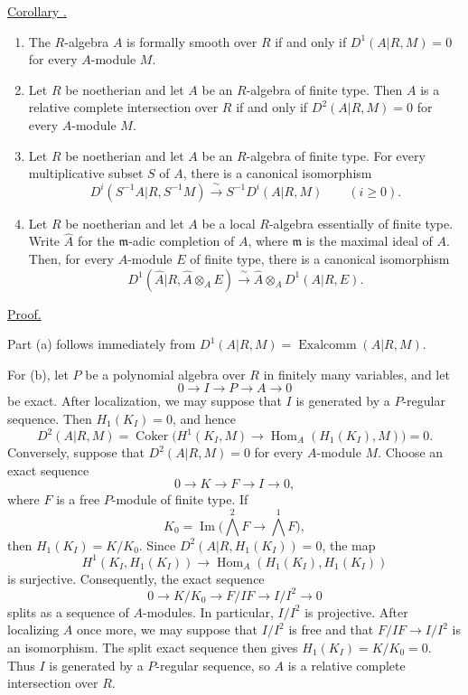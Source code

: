 
\underline{Corollary .}

\begin{enumerate}[label=(\alph*)]
\item The $R$-algebra $A$ is formally smooth over $R$ if and only if
$D^1(A|R,M)=0$ for every $A$-module $M$.

\item Let $R$ be noetherian and let $A$ be an $R$-algebra of finite
type. Then $A$ is a relative complete intersection over $R$ if and
only if $D^2(A|R,M)=0$ for every $A$-module $M$.

\item Let $R$ be noetherian and let $A$ be an $R$-algebra of finite
type. For every multiplicative subset $S$ of $A$, there is a canonical
isomorphism
\[
 D^i(S^{-1}A|R,S^{-1}M)
 \xrightarrow{\ \sim\ }S^{-1}D^i(A|R,M)
 \qquad(i\geq0).
\]

\item Let $R$ be noetherian and let $A$ be a local $R$-algebra
essentially of finite type. Write $\widehat A$ for the
$\mathfrak m$-adic completion of $A$, where $\mathfrak m$ is the
maximal ideal of $A$. Then, for every $A$-module $E$ of finite type,
there is a canonical isomorphism
\[
 D^1(\widehat A|R,\widehat A\otimes_AE)
 \xrightarrow{\ \sim\ }
 \widehat A\otimes_AD^1(A|R,E).
\]
\end{enumerate}

\underline{Proof.}

Part (a) follows immediately from
$D^1(A|R,M)=\operatorname{Exalcomm}(A|R,M)$.

For (b), let $P$ be a polynomial algebra over $R$ in finitely many
variables, and let
\[
 0\longrightarrow I\longrightarrow P\longrightarrow A
 \longrightarrow0
\]
be exact. After localization, we may suppose that $I$ is generated by
a $P$-regular sequence. Then $H_1(K_I)=0$, and hence
\[
 D^2(A|R,M)
 =\operatorname{Coker}\bigl(
 H^1(K_I,M)\longrightarrow
 \operatorname{Hom}_A(H_1(K_I),M)\bigr)=0.
\]
Conversely, suppose that $D^2(A|R,M)=0$ for every $A$-module $M$.
Choose an exact sequence
\[
 0\longrightarrow K\longrightarrow F\longrightarrow I
 \longrightarrow0,
\]
where $F$ is a free $P$-module of finite type. If
\[
 K_0=\operatorname{Im}\bigl(\textstyle\bigwedge^2F
 \longrightarrow\bigwedge^1F\bigr),
\]
then $H_1(K_I)=K/K_0$. Since
$D^2(A|R,H_1(K_I))=0$, the map
\[
 H^1(K_I,H_1(K_I))
 \longrightarrow
 \operatorname{Hom}_A(H_1(K_I),H_1(K_I))
\]
is surjective. Consequently, the exact sequence
\[
 0\longrightarrow K/K_0\longrightarrow F/IF
 \longrightarrow I/I^2\longrightarrow0
\]
splits as a sequence of $A$-modules. In particular, $I/I^2$ is
projective. After localizing $A$ once more, we may suppose that
$I/I^2$ is free and that $F/IF\longrightarrow I/I^2$ is an
isomorphism. The split exact sequence then gives
$H_1(K_I)=K/K_0=0$. Thus $I$ is generated by a $P$-regular sequence,
so $A$ is a relative complete intersection over $R$.

